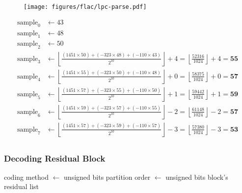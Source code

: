 \clearpage

\begin{figure}[h]
\texttt{[image: figures/flac/lpc-parse.pdf]}
\end{figure}
\begin{align*}
\text{sample}_0 &\leftarrow 43 \\
\text{sample}_1 &\leftarrow 48 \\
\text{sample}_2 &\leftarrow 50 \\
\text{sample}_3 &\leftarrow \left\lfloor\frac{(1451 \times 50) + (-323 \times 48) + (-110 \times 43)}{2 ^ {10}}\right\rfloor + 4 = \left\lfloor\frac{52316}{1024}\right\rfloor + 4 = \textbf{55} \\
\text{sample}_4 &\leftarrow \left\lfloor\frac{(1451 \times 55) + (-323 \times 50) + (-110 \times 48)}{2 ^ {10}}\right\rfloor + 0 = \left\lfloor\frac{58375}{1024}\right\rfloor + 0 = \textbf{57} \\
\text{sample}_5 &\leftarrow \left\lfloor\frac{(1451 \times 57) + (-323 \times 55) + (-110 \times 50)}{2 ^ {10}}\right\rfloor + 1 = \left\lfloor\frac{59442}{1024}\right\rfloor + 1 = \textbf{59} \\
\text{sample}_6 &\leftarrow \left\lfloor\frac{(1451 \times 59) + (-323 \times 57) + (-110 \times 55)}{2 ^ {10}}\right\rfloor - 2 = \left\lfloor\frac{61148}{1024}\right\rfloor - 2 = \textbf{57} \\
\text{sample}_7 &\leftarrow \left\lfloor\frac{(1451 \times 57) + (-323 \times 59) + (-110 \times 57)}{2 ^ {10}}\right\rfloor - 3 = \left\lfloor\frac{57380}{1024}\right\rfloor - 3 = \textbf{53} \\
\end{align*}

\clearpage

\subsubsection{Decoding Residual Block}
\label{residual_decoding_example}
coding method $\leftarrow$  unsigned bits\;
partition order $\leftarrow$  unsigned bits\;
\Return block's residual list\;
\EALGORITHM

